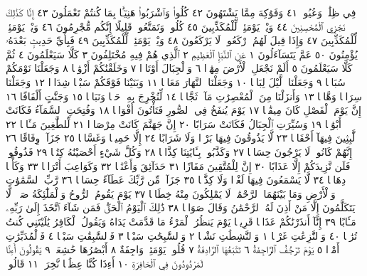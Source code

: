 فِي ظِلَٰلࣲ وَعُيُونࣲ ٤١ وَفَوَٰكِهَ مِمَّا يَشْتَهُونَ ٤٢ كُلُوا۟ وَٱشْرَبُوا۟ هَنِيٓـَٔۢا
بِمَا كُنتُمْ تَعْمَلُونَ ٤٣ إِنَّا كَذَٰلِكَ نَجْزِي ٱلْمُحْسِنِينَ ٤٤ وَيْلࣱ
يَوْمَئِذࣲ لِّلْمُكَذِّبِينَ ٤٥ كُلُوا۟ وَتَمَتَّعُوا۟ قَلِيلًا إِنَّكُم مُّجْرِمُونَ ٤٦ وَيْلࣱ
يَوْمَئِذࣲ لِّلْمُكَذِّبِينَ ٤٧ وَإِذَا قِيلَ لَهُمُ ٱرْكَعُوا۟ لَا يَرْكَعُونَ ٤٨
وَيْلࣱ يَوْمَئِذࣲ لِّلْمُكَذِّبِينَ ٤٩ فَبِأَيِّ حَدِيثِۭ بَعْدَهُۥ يُؤْمِنُونَ ٥٠
عَمَّ يَتَسَآءَلُونَ ١ عَنِ ٱلنَّبَإِ ٱلْعَظِيمِ ٢ ٱلَّذِي هُمْ فِيهِ مُخْتَلِفُونَ ٣
كَلَّا سَيَعْلَمُونَ ٤ ثُمَّ كَلَّا سَيَعْلَمُونَ ٥ أَلَمْ نَجْعَلِ ٱلْأَرْضَ مِهَٰدࣰا ٦
وَٱلْجِبَالَ أَوْتَادࣰا ٧ وَخَلَقْنَٰكُمْ أَزْوَٰجࣰا ٨ وَجَعَلْنَا نَوْمَكُمْ سُبَاتࣰا ٩
وَجَعَلْنَا ٱلَّيْلَ لِبَاسࣰا ١٠ وَجَعَلْنَا ٱلنَّهَارَ مَعَاشࣰا ١١ وَبَنَيْنَا
فَوْقَكُمْ سَبْعࣰا شِدَادࣰا ١٢ وَجَعَلْنَا سِرَاجࣰا وَهَّاجࣰا ١٣ وَأَنزَلْنَا مِنَ
ٱلْمُعْصِرَٰتِ مَآءࣰ ثَجَّاجࣰا ١٤ لِّنُخْرِجَ بِهِۦ حَبࣰّا وَنَبَاتࣰا ١٥ وَجَنَّٰتٍ
أَلْفَافًا ١٦ إِنَّ يَوْمَ ٱلْفَصْلِ كَانَ مِيقَٰتࣰا ١٧ يَوْمَ يُنفَخُ فِي ٱلصُّورِ
فَتَأْتُونَ أَفْوَاجࣰا ١٨ وَفُتِحَتِ ٱلسَّمَآءُ فَكَانَتْ أَبْوَٰبࣰا ١٩ وَسُيِّرَتِ
ٱلْجِبَالُ فَكَانَتْ سَرَابًا ٢٠ إِنَّ جَهَنَّمَ كَانَتْ مِرْصَادࣰا ٢١ لِّلطَّٰغِينَ
مَـَٔابࣰا ٢٢ لَّٰبِثِينَ فِيهَآ أَحْقَابࣰا ٢٣ لَّا يَذُوقُونَ فِيهَا بَرْدࣰا وَلَا
شَرَابًا ٢٤ إِلَّا حَمِيمࣰا وَغَسَّاقࣰا ٢٥ جَزَآءࣰ وِفَاقًا ٢٦ إِنَّهُمْ كَانُوا۟
لَا يَرْجُونَ حِسَابࣰا ٢٧ وَكَذَّبُوا۟ بِـَٔايَٰتِنَا كِذَّابࣰا ٢٨ وَكُلَّ شَيْءٍ
أَحْصَيْنَٰهُ كِتَٰبࣰا ٢٩ فَذُوقُوا۟ فَلَن نَّزِيدَكُمْ إِلَّا عَذَابًا ٣٠
إِنَّ لِلْمُتَّقِينَ مَفَازًا ٣١ حَدَآئِقَ وَأَعْنَٰبࣰا ٣٢ وَكَوَاعِبَ أَتْرَابࣰا ٣٣ وَكَأْسࣰا
دِهَاقࣰا ٣٤ لَّا يَسْمَعُونَ فِيهَا لَغْوࣰا وَلَا كِذَّٰبࣰا ٣٥ جَزَآءࣰ مِّن رَّبِّكَ عَطَآءً
حِسَابࣰا ٣٦ رَّبِّ ٱلسَّمَٰوَٰتِ وَٱلْأَرْضِ وَمَا بَيْنَهُمَا ٱلرَّحْمَٰنِۖ لَا يَمْلِكُونَ
مِنْهُ خِطَابࣰا ٣٧ يَوْمَ يَقُومُ ٱلرُّوحُ وَٱلْمَلَٰٓئِكَةُ صَفࣰّاۖ لَّا يَتَكَلَّمُونَ
إِلَّا مَنْ أَذِنَ لَهُ ٱلرَّحْمَٰنُ وَقَالَ صَوَابࣰا ٣٨ ذَٰلِكَ ٱلْيَوْمُ ٱلْحَقُّۖ فَمَن
شَآءَ ٱتَّخَذَ إِلَىٰ رَبِّهِۦ مَـَٔابًا ٣٩ إِنَّآ أَنذَرْنَٰكُمْ عَذَابࣰا قَرِيبࣰا يَوْمَ يَنظُرُ
ٱلْمَرْءُ مَا قَدَّمَتْ يَدَاهُ وَيَقُولُ ٱلْكَافِرُ يَٰلَيْتَنِي كُنتُ تُرَٰبَۢا ٤٠
وَٱلنَّٰزِعَٰتِ غَرْقࣰا ١ وَٱلنَّٰشِطَٰتِ نَشْطࣰا ٢ وَٱلسَّٰبِحَٰتِ سَبْحࣰا ٣
فَٱلسَّٰبِقَٰتِ سَبْقࣰا ٤ فَٱلْمُدَبِّرَٰتِ أَمْرࣰا ٥ يَوْمَ تَرْجُفُ ٱلرَّاجِفَةُ ٦
تَتْبَعُهَا ٱلرَّادِفَةُ ٧ قُلُوبࣱ يَوْمَئِذࣲ وَاجِفَةٌ ٨ أَبْصَٰرُهَا خَٰشِعَةࣱ ٩
يَقُولُونَ أَءِنَّا لَمَرْدُودُونَ فِي ٱلْحَافِرَةِ ١٠ أَءِذَا كُنَّا عِظَٰمࣰا نَّخِرَةࣰ ١١ قَالُوا۟
